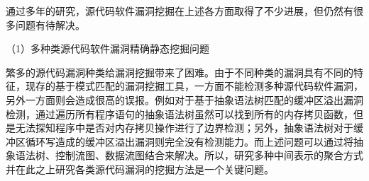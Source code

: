 通过多年的研究，源代码软件漏洞挖掘在上述各方面取得了不少进展，但仍然有很多问题有待解决。




（1）多种类源代码软件漏洞精确静态挖掘问题

繁多的源代码漏洞种类给漏洞挖掘带来了困难。由于不同种类的漏洞具有不同的特 %
征，现存的基于模式匹配的漏洞挖掘工具，一方面不能检测多种源代码软件漏洞，另外一方面则会造成很高的误报。例如对于基于抽象语法树匹配的缓冲区溢出漏洞检测，通过遍历所有程序语句的抽象语法树虽然可以找到所有的内存拷贝函数，但是无法探知程序中是否对内存拷贝操作进行了边界检测；另外，抽象语法树对于缓冲区循环写造成的缓冲区溢出漏洞则完全没有检测能力。而上述问题可以通过将抽象语法树、控制流图、数据流图结合来解决。所以，研究多种中间表示的聚合方式并在此之上研究各类源代码漏洞的挖掘方法是一个关键问题。

